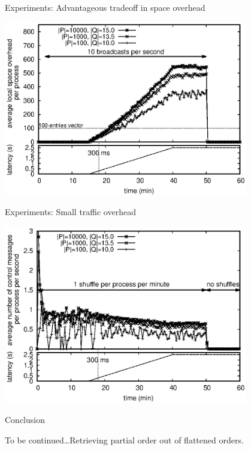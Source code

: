 \documentclass[10pt, xcolor={usenames, dvipsnames}]{beamer}
\begin{document}
\begin{frame}{Experiments: Advantageous tradeoff in space overhead}

  \begin{center}
    \includegraphics[width=0.8\textwidth]{img/overhead.eps}
  \end{center}

\end{frame}

\begin{frame}{Experiments: Small traffic overhead}
  \begin{center}
    \includegraphics[width=0.8\textwidth]{img/controlmessages.eps}
  \end{center}
\end{frame}


\begin{frame}{Conclusion}
\end{frame}

\begin{frame}[standout]
  To be continued\ldots Retrieving partial order out of flattened orders.
\end{frame}
\end{document}
